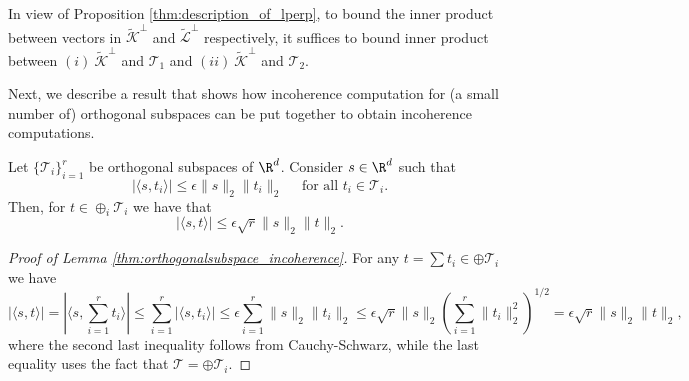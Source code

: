 In view of Proposition \ref{thm:description_of_lperp}, to bound the inner product between vectors  in $\tilde{\mathcal{K}}^\perp$ and $\tilde{\mathcal{L}}^\perp$ respectively, it suffices to bound inner product between $ (i) \ \tilde{\mathcal{K}}^\perp$  and $\mathcal{T}_1$ and $ (ii) \ \tilde{\mathcal{K}}^\perp$  and $\mathcal{T}_2$.


Next, we describe a result that shows how incoherence computation for (a small number of) orthogonal subspaces can be put together to obtain incoherence computations.  %

\begin{lemma}\label{thm:orthogonalsubspace_incoherence}  Let  $\{ \mathcal{T}_i \}_{i=1}^{r}$ be orthogonal subspaces of $\R^d$. Consider $s\in \R^d$ such that 
$$
| \langle s,t_i \rangle | \leq \epsilon \| s \|_2 \| t_i \|_2 \quad \text{ for all }  t_i \in \mathcal{T}_i.
$$
Then, for $t\in \oplus_i \mathcal{T}_i $ we have that 
$$
| \langle s,t \rangle | \leq \epsilon \sqrt{r}  \| s \|_2 \| t \|_2.
$$
\end{lemma}

\begin{proof}[Proof of Lemma \ref{thm:orthogonalsubspace_incoherence}]
For any  $t= \sum t_i\in \oplus \mathcal{T}_i $
we have 
$$| \langle s, t \rangle | = | \langle s, \sum_{i=1}^r t_i \rangle | \leq \sum_{i=1}^r | \langle s, t_i \rangle | \leq \epsilon \sum_{i=1}^r \| s \|_2 \| t_i \|_2 \leq \epsilon \sqrt{r} \|s\|_2(\sum_{i=1}^r \| t_i \|_2^2)^{1/2} = \epsilon\sqrt{r}\|s\|_2  \| t \|_2,$$
where   the second last inequality follows from Cauchy-Schwarz, while the last equality uses the fact that $\mathcal{T} = \oplus \mathcal{T}_i$.
\end{proof}


